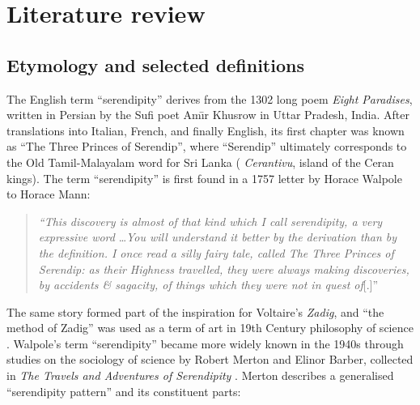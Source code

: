 \section{Literature review} \label{sec:literature-review}

\subsection{Etymology and selected definitions} \label{sec:overview-serendipity}  
The English term ``serendipity'' derives from the 1302 long poem \emph{Eight Paradises}, written in Persian by the Sufi poet Am\={\i}r Khusrow in Uttar Pradesh, India.  After translations into Italian, French, and finally English, its first chapter was known as ``The Three Princes of Serendip'', where ``Serendip'' ultimately corresponds to the Old Tamil-Malayalam word for Sri Lanka (%
\emph{Cerantivu}, island of the Ceran kings).
%
The term ``serendipity'' is first found in a 1757 letter by Horace Walpole to Horace Mann:
\begin{quote}
\emph{``This discovery is almost of that kind which I call serendipity, a very expressive
word} \ldots \emph{You will understand it better by the derivation than by the
definition. I once read a silly fairy tale, called The Three Princes of Serendip:
as their Highness travelled, they were always making discoveries, by accidents
\& sagacity, of things which they were not in quest of}[.]''~\cite[p. 633]{van1994anatomy}
\end{quote}
The same story formed part of the inspiration for Voltaire's \emph{Zadig}, and ``the method of Zadig'' was used as a term of art in 19th Century philosophy of science \cite{huxley1894science}.
Walpole's term ``serendipity'' became more widely known in the 1940s through studies on the sociology of science by Robert Merton and Elinor Barber, collected in \emph{The Travels and Adventures of Serendipity} \citep{merton}.  Merton describes a generalised ``serendipity pattern'' and its constituent parts:


